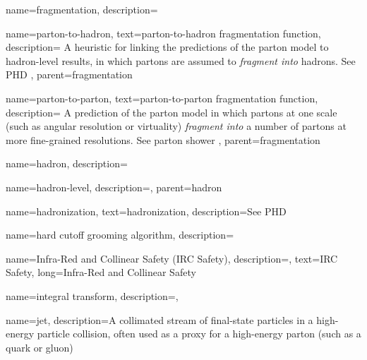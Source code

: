 {
  name=fragmentation,
  description={}
}


    {
      name=parton-to-hadron,
      text=parton-to-hadron fragmentation function,
      description={
        A heuristic for linking the predictions of the parton model to hadron-level results, in which partons are assumed to \textit{fragment into} hadrons.
        See PHD
    },
      parent=fragmentation
    }

    {
      name=parton-to-parton,
      text=parton-to-parton fragmentation function,
      description={
          A prediction of the parton model in which partons at one scale (such as angular resolution or virtuality) \textit{fragment into} a number of partons at more fine-grained resolutions.
          See parton shower
      },
      parent=fragmentation
    }






{
  name=hadron,
  description={}
}

    {
      name=hadron-level,
      description={},
      parent=hadron
    }


{
  name=hadronization,
  text=hadronization,
  description={See PHD}
}

{
  name=hard cutoff grooming algorithm,
  description={}
}


{
    name=Infra-Red and Collinear Safety (IRC Safety),
    description={},
    text={IRC Safety},
    long={Infra-Red and Collinear Safety}
}


{
    name=integral transform,
    description={},
}



{
  name=jet,
  description={A collimated stream of final-state particles in a high-energy particle collision, often used as a proxy for a high-energy parton (such as a quark or gluon)}
}

